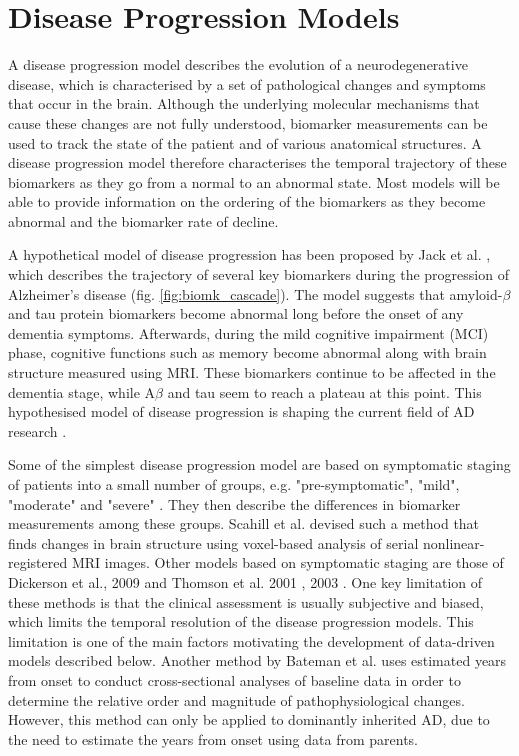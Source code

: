 \section{Disease Progression Models}
\label{sec:disease_prog_models}

A disease progression model describes the evolution of a neurodegenerative disease, which is characterised by a set of pathological changes and symptoms that occur in the brain. Although the underlying molecular mechanisms that cause these changes are not fully understood, biomarker measurements can be used to track the state of the patient and of various anatomical structures. A disease progression model therefore characterises the temporal trajectory of these biomarkers as they go from a normal to an abnormal state. Most models will be able to provide information on the ordering of the biomarkers as they become abnormal and the biomarker rate of decline. 

A hypothetical model of disease progression has been proposed by Jack et al. \cite{jack2010hypothetical,jack2013tracking}, which describes the trajectory of several key biomarkers during the progression of Alzheimer's disease (fig. \ref{fig:biomk_cascade}). The model suggests that amyloid-$\beta$ and tau protein biomarkers become abnormal long before the onset of any dementia symptoms. Afterwards, during the mild cognitive impairment (MCI) phase,  cognitive functions such as memory become abnormal along with brain structure measured using MRI. These biomarkers continue to be affected in the dementia stage, while A$\beta$ and tau seem to reach a plateau at this point. This hypothesised model of disease progression is shaping the current field of AD research \cite{donohue2014estimating}.

Some of the simplest disease progression model are based on symptomatic staging of patients into a small number of groups, e.g. "pre-symptomatic", "mild", "moderate" and "severe" \cite{fonteijn2012event}. They then describe the differences in biomarker measurements among these groups. Scahill et al. \cite{scahill2002mapping} devised such a method that finds changes in brain structure using voxel-based analysis of serial nonlinear-registered MRI images. Other models based on symptomatic staging are those of Dickerson et al., 2009 \cite{dickerson2009cortical} and Thomson et al. 2001 \cite{thompson2001cortical}, 2003 \cite{thompson2003dynamics}. One key limitation of these methods is that the clinical assessment is usually subjective and biased, which limits the temporal resolution of the disease progression models. This limitation is one of the main factors motivating the development of data-driven models described below. Another method by Bateman et al. \cite{bateman2012clinical} uses estimated years from onset to conduct cross-sectional analyses of baseline data in order to determine the relative order and magnitude of pathophysiological changes. However, this method can only be applied to dominantly inherited AD, due to the need to estimate the years from onset using data from parents.

